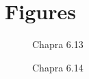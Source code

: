 \documentclass{article}
\begin{document}
\section{Figures}
\begin{figure}[h!]
\begin{center}
\caption{Chapra 6.13}
\end{center}
\end{figure}

\begin{figure}[h!]
\begin{center}
\caption{Chapra 6.14}
\end{center}
\end{figure}
\end{document}

